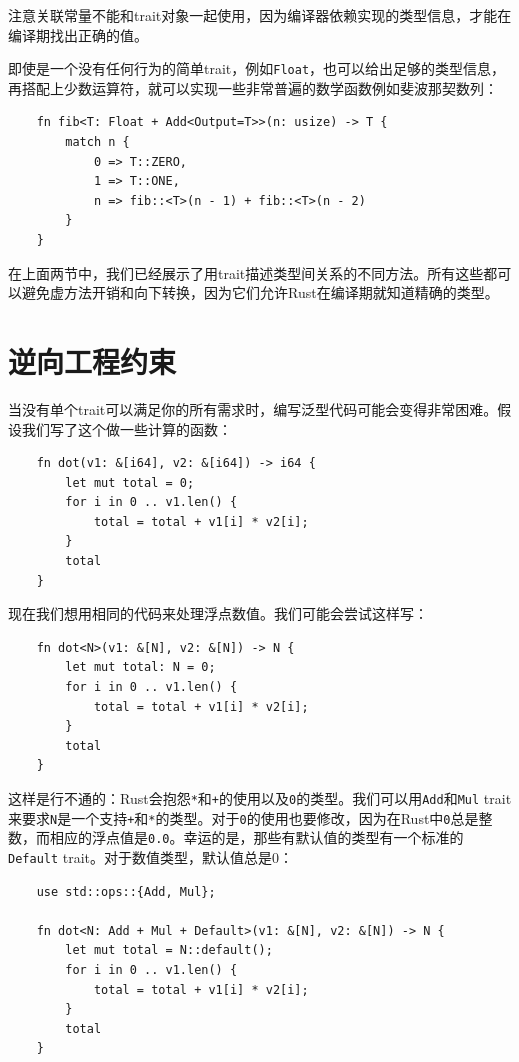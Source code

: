 注意关联常量不能和trait对象一起使用，因为编译器依赖实现的类型信息，才能在编译期找出正确的值。

即使是一个没有任何行为的简单trait，例如\texttt{Float}，也可以给出足够的类型信息，再搭配上少数运算符，就可以实现一些非常普遍的数学函数例如斐波那契数列：
\begin{verbatim}
    fn fib<T: Float + Add<Output=T>>(n: usize) -> T {
        match n {
            0 => T::ZERO,
            1 => T::ONE,
            n => fib::<T>(n - 1) + fib::<T>(n - 2)
        }
    }
\end{verbatim}

在上面两节中，我们已经展示了用trait描述类型间关系的不同方法。所有这些都可以避免虚方法开销和向下转换，因为它们允许Rust在编译期就知道精确的类型。

\section{逆向工程约束}\label{RevBound}

当没有单个trait可以满足你的所有需求时，编写泛型代码可能会变得非常困难。假设我们写了这个做一些计算的函数：
\begin{verbatim}
    fn dot(v1: &[i64], v2: &[i64]) -> i64 {
        let mut total = 0;
        for i in 0 .. v1.len() {
            total = total + v1[i] * v2[i];
        }
        total
    }
\end{verbatim}

现在我们想用相同的代码来处理浮点数值。我们可能会尝试这样写：
\begin{verbatim}
    fn dot<N>(v1: &[N], v2: &[N]) -> N {
        let mut total: N = 0;
        for i in 0 .. v1.len() {
            total = total + v1[i] * v2[i];
        }
        total
    }
\end{verbatim}

这样是行不通的：Rust会抱怨\texttt{*}和\texttt{+}的使用以及\texttt{0}的类型。我们可以用\texttt{Add}和\texttt{Mul} trait来要求\texttt{N}是一个支持\texttt{+}和\texttt{*}的类型。对于\texttt{0}的使用也要修改，因为在Rust中\texttt{0}总是整数，而相应的浮点值是\texttt{0.0}。幸运的是，那些有默认值的类型有一个标准的\texttt{Default} trait。对于数值类型，默认值总是0：
\begin{verbatim}
    use std::ops::{Add, Mul};

    fn dot<N: Add + Mul + Default>(v1: &[N], v2: &[N]) -> N {
        let mut total = N::default();
        for i in 0 .. v1.len() {
            total = total + v1[i] * v2[i];
        }
        total
    }
\end{verbatim}

